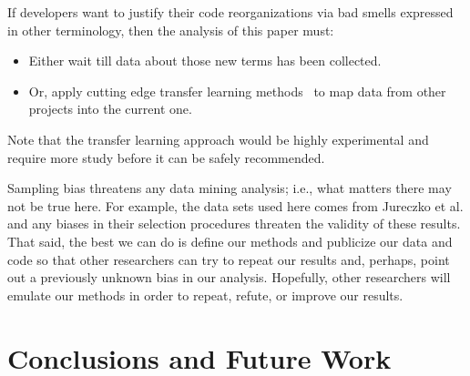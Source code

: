 \documentclass[sigconf, proceedings, 9pt]{acmart}
\begin{document}
If developers want to justify their code reorganizations
via bad smells expressed in other terminology,
then the  analysis of this paper must:
\begin{itemize}
	\item Either wait till
	data about those new
	terms has been collected.
	\item Or, apply cutting edge transfer learning
	methods~\cite{Nam15,Jing15, krishna16} to map data from other projects
	into the current one.
\end{itemize}
Note that the transfer learning approach would
be highly experimental and require more study
before it can be safely recommended.

Sampling bias threatens any data mining analysis; i.e., what matters
there may not be true here. For example, the data sets used here comes 
from 
Jureczko et al. and any biases in their selection procedures
threaten the validity of these results.
That said,
the best we can do is define our methods and publicize our data and code so 
that other researchers can
try to repeat our results and, perhaps, point out a previously unknown bias
in our analysis. Hopefully, other researchers will emulate our methods in
order to repeat, refute, or improve our results.


\section{Conclusions and Future Work}
\label{sect:conclusion}


\balance


\end{document}
